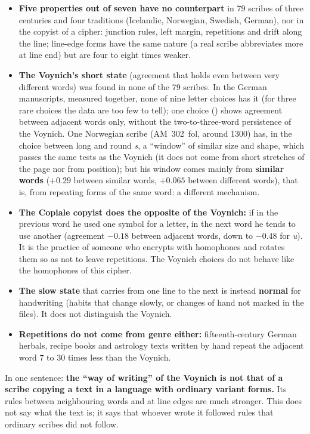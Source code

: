 \begin{itemize}
\item \textbf{Five properties out of seven have no counterpart} in 79 scribes of three centuries and four traditions
  (Icelandic, Norwegian, Swedish, German), nor in the copyist of a cipher: junction rules, left margin, repetitions and
  drift along the line; line-edge forms have the same nature (a
  real scribe abbreviates more at line end) but are four to eight times weaker.
\item \textbf{The Voynich's short state} (agreement that holds even between very different words) was found in none of
  the 79 scribes. In the German manuscripts, measured together, none of nine letter choices has it (for three rare
  choices the data are too few to tell); one choice () shows agreement between adjacent words only, without the
  two-to-three-word persistence of the Voynich.
  One Norwegian scribe (AM~302~fol, around 1300) has, in the choice between long and round \emph{s}, a ``window'' of
  similar size and shape, which passes the same tests as the Voynich (it does not come from short stretches of the page
  nor from position); but his window comes mainly from \textbf{similar words} ($+0.29$ between similar words, $+0.065$
  between different words), that is, from repeating forms of the same word: a different mechanism.
\item \textbf{The Copiale copyist does the opposite of the Voynich:} if in the previous word he used one symbol for a
  letter, in the next word he tends to use another (agreement $-0.18$ between adjacent words, down to $-0.48$ for
  \emph{u}). It is the practice of someone who encrypts with homophones and rotates them so as not to leave repetitions.
  The Voynich choices do not behave like the homophones of this cipher.
\item \textbf{The slow state} that carries from one line to the next is instead \textbf{normal} for handwriting (habits
  that change slowly, or changes of hand not marked in the files). It does not distinguish the Voynich.
\item \textbf{Repetitions do not come from genre either:} fifteenth-century German herbals, recipe books and astrology
  texts written by hand repeat the adjacent word 7 to 30 times less than the Voynich.
\end{itemize}

\noindent In one sentence: \textbf{the ``way of writing'' of the Voynich is not that of a scribe copying a text in a
language with ordinary variant forms.} Its rules between neighbouring words and at line edges are much stronger. This
does not say what the text is; it says that whoever wrote it followed rules that ordinary scribes did not follow.

